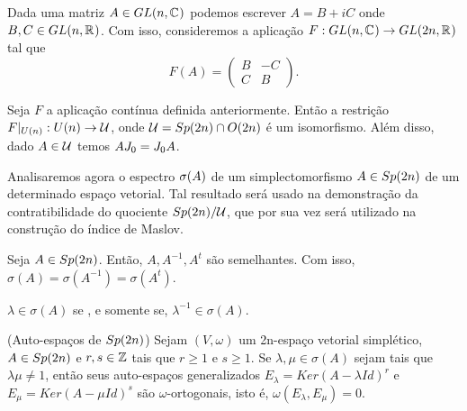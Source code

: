 \documentclass{beamer}
\begin{document}
\begin{frame}
	
	Dada uma matriz $A \in GL(n, \mathbb{C}^{})$ podemos escrever $A = B+iC$ onde $B,C \in GL(n, \mathbb{R}^{})$. Com isso, consideremos a aplicação $F:GL(n, \mathbb{C}^{}) \to GL(2n, \mathbb{R}^{})$ tal que 
	$$
	F(A)=
	\left(
	\begin{array}{cc}
	B & -C
	\\
	C & B
	\end{array}
	\right).
	$$
	
	
	\begin{lema}
		Seja $F$ a aplicação contínua definida anteriormente. Então a restrição $F|_{U(n)}: U(n) \to \mathcal{U} $, onde $\mathcal{U}  = Sp(2n)\cap O(2n)$ é um isomorfismo. Além disso, dado $A \in \mathcal{U} $ temos $AJ_{0}=J_{0} A$.
	\end{lema}
\end{frame}

\begin{frame}
		Analisaremos agora o espectro $\sigma(A)$ de um simplectomorfismo $A \in Sp(2n)$ de um determinado espaço vetorial. Tal resultado será usado na demonstração da contratibilidade do quociente $Sp(2n)/\mathcal{U}$, que por sua vez será utilizado na construção do índice de Maslov.
		
		\begin{lema}
			Seja $A \in Sp(2n)$. Então, $A, A^{-1}, A^{t}$ são semelhantes. Com isso, $\sigma(A) = \sigma(A^{-1}) = \sigma(A^{t}) $.
		\end{lema}
		\begin{observacao}
			$\lambda \in \sigma(A)$ se , e somente se, $\lambda^{-1}\in \sigma(A)$.
		\end{observacao}
		
\end{frame}

\begin{frame}
	\begin{lema}
		(Auto-espaços de $Sp(2n)$) Sejam $(V, \omega)$ um 2n-espaço vetorial simplético, $A \in Sp(2n)$ e $r,s \in \mathbb{Z}$ tais que $r\geq 1$ e $s\geq 1$. Se $\lambda, \mu \in \sigma(A)$ sejam tais que $\lambda\mu \neq 1$, então seus auto-espaços generalizados $E_{\lambda}=Ker(A-\lambda Id)^{r}$ e  $E_{\mu}=Ker(A-\mu Id)^{s}$ são $\omega$-ortogonais, isto é, $\omega(E_{\lambda}, E_{\mu}) = 0$.
	\end{lema}
\end{frame}
\end{document}
